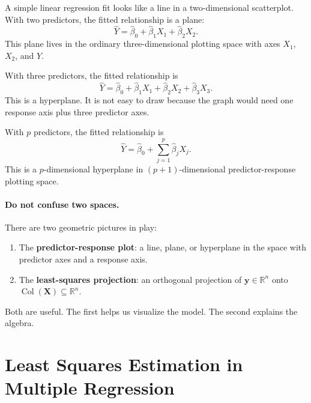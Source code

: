A simple linear regression fit looks like a line in a two-dimensional scatterplot.  With two predictors, the fitted relationship is a plane:
\begin{equation}
  \widehat{Y}=\widehat{\beta}_0+\widehat{\beta}_1X_1+\widehat{\beta}_2X_2.
\end{equation}
This plane lives in the ordinary three-dimensional plotting space with axes \(X_1\), \(X_2\), and \(Y\).

With three predictors, the fitted relationship is
\begin{equation}
  \widehat{Y}=\widehat{\beta}_0+\widehat{\beta}_1X_1+\widehat{\beta}_2X_2+\widehat{\beta}_3X_3.
\end{equation}
This is a hyperplane.  It is not easy to draw because the graph would need one response axis plus three predictor axes.

With \(p\) predictors, the fitted relationship is
\begin{equation}
  \boxed{\widehat{Y}=\widehat{\beta}_0+\sum_{j=1}^p \widehat{\beta}_jX_j.}
\end{equation}
This is a \(p\)-dimensional hyperplane in \((p+1)\)-dimensional predictor-response plotting space.

\paragraph{Do not confuse two spaces.}
There are two geometric pictures in play:
\begin{enumerate}
  \item The \textbf{predictor-response plot}: a line, plane, or hyperplane in the space with predictor axes and a response axis.
  \item The \textbf{least-squares projection}: an orthogonal projection of \(\mathbf{y}\in\mathbb{R}^n\) onto \(\operatorname{Col}(\mathbf{X})\subseteq\mathbb{R}^n\).
\end{enumerate}
Both are useful.  The first helps us visualize the model.  The second explains the algebra.

\section{Least Squares Estimation in Multiple Regression}

